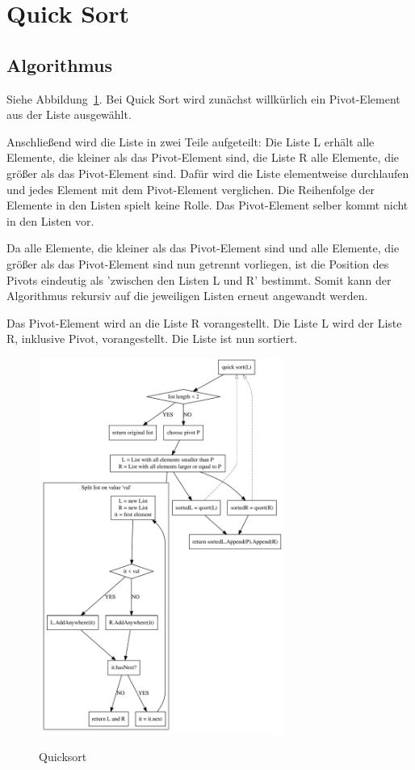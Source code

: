 \documentclass[11pt]{article}
\begin{document}
    \section{Quick Sort}\label{sec:quick-sort}

    \subsection{Algorithmus}\label{subsec:Qalgorithmus}
    Siehe Abbildung~\ref{fig:qsort}.
    Bei Quick Sort wird zunächst willkürlich ein Pivot-Element aus der Liste
    ausgewählt.

    Anschließend wird die Liste in zwei Teile aufgeteilt: Die Liste L erhält alle
    Elemente, die kleiner als das Pivot-Element sind, die Liste R alle
    Elemente, die größer als das Pivot-Element sind.
    Dafür wird die Liste elementweise durchlaufen und jedes Element mit dem
    Pivot-Element verglichen.
    Die Reihenfolge der Elemente in den Listen spielt keine Rolle.
    Das Pivot-Element selber kommt nicht in den Listen vor.

    Da alle Elemente, die kleiner als das Pivot-Element sind und alle Elemente,
    die größer als das Pivot-Element sind nun getrennt vorliegen, ist die
    Position des Pivots eindeutig als 'zwischen den Listen L und R' bestimmt.
    Somit kann der Algorithmus rekursiv auf die jeweiligen Listen erneut
    angewandt werden.

    Das Pivot-Element wird an die Liste R vorangestellt.
    Die Liste L wird der Liste R, inklusive Pivot, vorangestellt.
    Die Liste ist nun sortiert.

    \begin{figure}[hbt]
        \caption{Quicksort}
        \centering
        \includegraphics[width = 8cm]{qsort.pdf}\label{fig:qsort}
    \end{figure}
\end{document}
